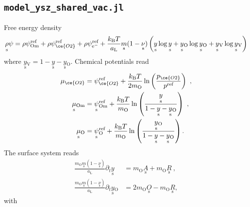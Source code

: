 \documentclass{article}
\numberwithin{equation}{section}
\newcommand{\us}[1]{\underset{\textrm{s}}{#1}{}}
\def\kB{k_\mathrm{B}}
\def\Ox{\mathrm{O}}
\def\Om{\mathrm{Om}}
\newcommand{\OO}{{\ce{O2}}}
\def\eM{\mathrm{e^-}}
\def\aL{a_\mathrm{L}}
\def\ys{\us y}
\newcommand{\ysV}{\us y_{\textrm{V}}}
\def\yOs{{\us y_\textrm{O}}}
\def\REF{\textrm{ref}}
\begin{document}
\subsection{\texttt{model\_ysz\_shared\_vac.jl}}
Free energy density
\begin{align}
    \us\rho\psi = 
              \rho\psi^\REF_\Om
            + \rho\psi^\REF_\OO
            + \rho\psi^\REF_\eM
            + \frac{\kB T}{\aL}\us m(1-\us\nu) 
            \left( 
                \ys   \log {\ys} 
                +\yOs  \log {\yOs}
                +\ysV  \log {\ysV}
            \right)
    \label{}
\end{align}
where $\ysV = 1 - \ys - \yOs$.
Chemical potentials read
\begin{subequations}
\begin{align}
\mu_{\OO} &= \psi_{\OO}^\REF + \frac{\kB T}{2 m_\Ox}\ln 
\left( 
    \frac{p_\OO}{p^\REF} 
\right)~,
\\
\us\mu_{\Om} 
&= 
\us \psi_{\Om}^\REF 
+ 
\frac{\kB T}{m_\Ox} \ln 
\left(  
	\frac{\ys}{1-\ys - \yOs}
\right)~,
\\
\us\mu_{\Ox} 
&= 
\us \psi_{\Ox}^\REF 
+ 
\frac{\kB T}{m_\Ox} \ln 
\left(  
	\frac{\yOs}{1-\ys - \yOs}
\right).
\end{align}
\end{subequations}
The surface system reads
\begin{subequations}
\begin{align}
 \frac{m_\Ox \us m (1- \us \nu)}{\aL}\partial_t \ys
&=
m_\Ox \us A
+
m_\Ox \us R~,
\\
 \frac{m_\Ox \us m (1- \us \nu)}{\aL}\partial_t \yOs
&=
2 m_\Ox \us O
-
m_\Ox \us R,
\end{align}
\end{subequations}
with
\end{document}
